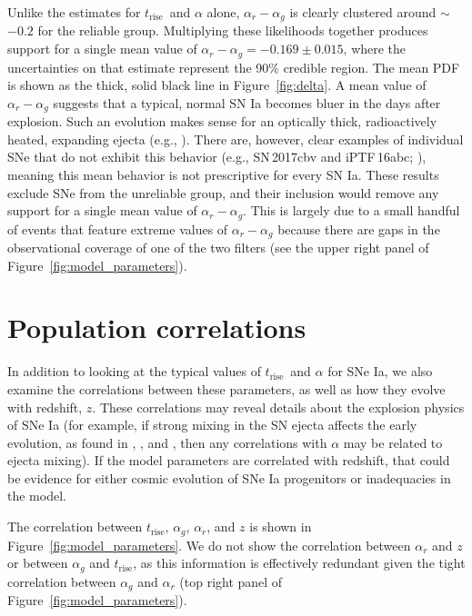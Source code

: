 \documentclass[twocolumn]{aastex63}
\newcommand{\trise}{$t_\mathrm{rise}$}
\begin{document}
Unlike the estimates for \trise\ and $\alpha$ alone, $\alpha_r - \alpha_g$ is
clearly clustered around $\sim$${-0.2}$ for the reliable group. Multiplying
these likelihoods together produces support for a single mean value of
$\alpha_r - \alpha_g = -0.169 \pm 0.015$, where the uncertainties on that
estimate represent the 90\% credible region. The mean PDF is shown as the
thick, solid black line in Figure~\ref{fig:delta}. A mean value of $\alpha_r -
\alpha_g$ suggests that a typical, normal SN Ia becomes bluer in the days
after explosion. Such an evolution makes sense for an optically thick,
radioactively heated, expanding ejecta (e.g., \citealt{Piro16,Magee19}). There
are, however, clear examples of individual SNe that do not exhibit this
behavior (e.g., SN\,2017cbv and iPTF\,16abc;
\citealt{Hosseinzadeh17,Miller18}), meaning this mean behavior is not
prescriptive for every SN Ia. These results exclude SNe from the unreliable
group, and their inclusion would remove any support for a single mean value of
$\alpha_r - \alpha_g$. This is largely due to a small handful of events that
feature extreme values of $\alpha_r - \alpha_g$ because there are gaps in the
observational coverage of one of the two filters (see the upper right panel of
Figure~\ref{fig:model_parameters}).

\section{Population correlations}

In addition to looking at the typical values of \trise\ and $\alpha$ for SNe
Ia, we also examine the correlations between these parameters, as well as how
they evolve with redshift, $z$. These correlations may reveal details about
the explosion physics of SNe Ia (for example, if strong mixing in the SN
ejecta affects the early evolution, as found in \citealt{Piro16},
\citealt{Magee18}, and \citealt{Magee19}, then any correlations with $\alpha$
may be related to ejecta mixing). If the model parameters are correlated with
redshift, that could be evidence for either cosmic evolution of SNe Ia
progenitors or inadequacies in the model.

The correlation between $t_\mathrm{rise}$, $\alpha_g$, $\alpha_r$, and $z$ is
shown in Figure~\ref{fig:model_parameters}. We do not show the correlation
between $\alpha_r$ and $z$ or between $\alpha_g$ and \trise, as this
information is effectively redundant given the tight correlation between
$\alpha_g$ and $\alpha_r$ (top right panel of
Figure~\ref{fig:model_parameters}).
\end{document}
